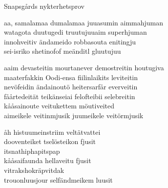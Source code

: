 \begin{song}{Snapsgårds nykterhetsprov}
	

    aa, samalamaa dumalamaa juuasumin aimmahjuman\\
	watagota duutugedi truutujuuaim superhjuman\\
	innohveitiv ändameido robbasouta enitingju\\
	sei-isriko shetinofof meänditl gluutujuu

	aaim devasteitin mourtanever demostreitin houtugiva\\
	maaterfakkin Oodi-ensa fiilinlaikits leviteitin\\
	nevöfeidin ändainoutö heitersarfår everveitin\\
	fåårtedeität teikänseiai felofteibii selebreitin\\
	kååsainoute veitukettem möutiveited\\
	aimeikele veitinmjusik juumeikele veitörmjusik

	åh histuumeinstriim veltätvattei\\
	dooventeiket tselösteikon fjusit\\
	itsnathiphapitspap\\
	kååsaifaunda hellaveitu fjusit\\
	vitrakshokräpvitdak\\
	trouonluusjour selfändmeikem luusit
	
\end{song}
